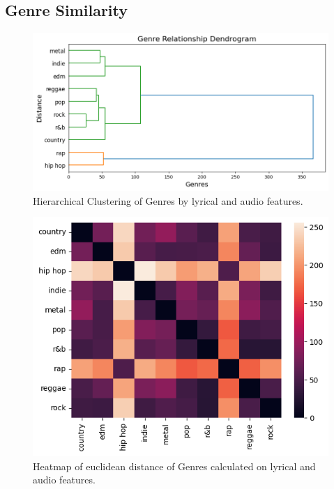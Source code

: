 \subsection{Genre Similarity}

\begin{center}
\begin{figure}[H]
  \centering
  \includegraphics[width=6in]{img/genres_dendrogram.png}
  \caption{Hierarchical Clustering of Genres by lyrical and audio features.}
  \label{Figure:genres_dendrogram}
\end{figure}
\end{center}

\begin{center}
\begin{figure}[H]
  \centering
  \includegraphics[width=6in]{img/genres_similarity_heatmap.png}
  \caption{Heatmap of euclidean distance of Genres calculated on lyrical and
  audio features.}
  \label{Figure:genres_similarity_heatmap}
\end{figure}
\end{center}

